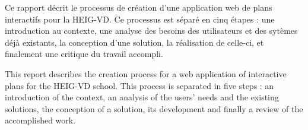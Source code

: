 Ce rapport décrit le processus de création d'une application web de plans interactifs pour la HEIG-VD.
Ce processus est séparé en cinq étapes : une introduction au contexte,
une analyse des besoins des utilisateurs et des sytèmes déjà existants,
la conception d'une solution, la réalisation de celle-ci,
et finalement une critique du travail accompli.



\asterism

This report describes the creation process for a web application of interactive plans for the HEIG-VD school.
This process is separated in five steps : an introduction of the context,
an analysis of the users' needs and the existing solutions,
the conception of a solution, its development
and finally a review of the accomplished work.